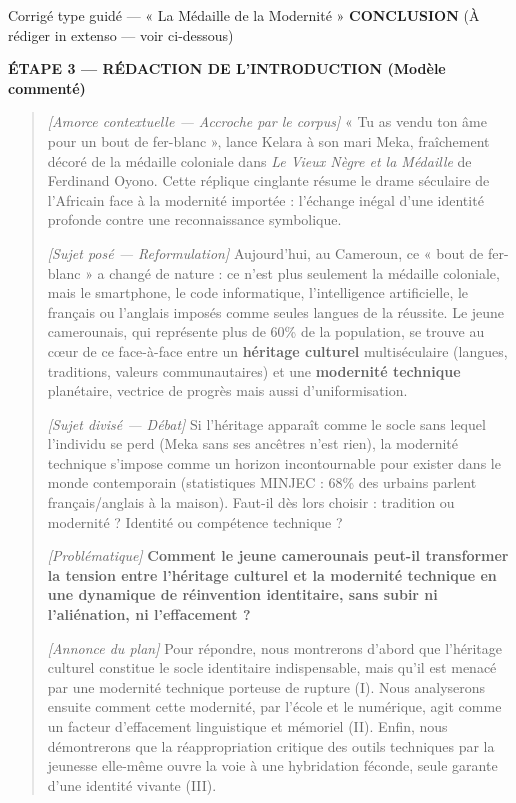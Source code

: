 \documentclass[11pt]{article}
\begin{document}
\begin{exoresolu}{Corrigé type guidé — « La Médaille de la Modernité »}
\textbf{CONCLUSION} (À rédiger in extenso — voir ci-dessous)

\tcblower

\textbf{ÉTAPE 3 — RÉDACTION DE L'INTRODUCTION (Modèle commenté)}

\begin{quote}
    \textit{[Amorce contextuelle — Accroche par le corpus]} « Tu as vendu ton âme pour un bout de fer-blanc », lance Kelara à son mari Meka, fraîchement décoré de la médaille coloniale dans \emph{Le Vieux Nègre et la Médaille} de Ferdinand Oyono. Cette réplique cinglante résume le drame séculaire de l'Africain face à la modernité importée : l'échange inégal d'une identité profonde contre une reconnaissance symbolique.
    
    \textit{[Sujet posé — Reformulation]} Aujourd'hui, au Cameroun, ce « bout de fer-blanc » a changé de nature : ce n'est plus seulement la médaille coloniale, mais le smartphone, le code informatique, l'intelligence artificielle, le français ou l'anglais imposés comme seules langues de la réussite. Le jeune camerounais, qui représente plus de 60\% de la population, se trouve au cœur de ce face-à-face entre un \textbf{héritage culturel} multiséculaire (langues, traditions, valeurs communautaires) et une \textbf{modernité technique} planétaire, vectrice de progrès mais aussi d'uniformisation.
    
    \textit{[Sujet divisé — Débat]} Si l'héritage apparaît comme le socle sans lequel l'individu se perd (Meka sans ses ancêtres n'est rien), la modernité technique s'impose comme un horizon incontournable pour exister dans le monde contemporain (statistiques MINJEC : 68\% des urbains parlent français/anglais à la maison). Faut-il dès lors choisir : tradition ou modernité ? Identité ou compétence technique ?
    
    \textit{[Problématique]} \textbf{Comment le jeune camerounais peut-il transformer la tension entre l'héritage culturel et la modernité technique en une dynamique de réinvention identitaire, sans subir ni l'aliénation, ni l'effacement ?}
    
    \textit{[Annonce du plan]} Pour répondre, nous montrerons d'abord que l'héritage culturel constitue le socle identitaire indispensable, mais qu'il est menacé par une modernité technique porteuse de rupture (I). Nous analyserons ensuite comment cette modernité, par l'école et le numérique, agit comme un facteur d'effacement linguistique et mémoriel (II). Enfin, nous démontrerons que la réappropriation critique des outils techniques par la jeunesse elle-même ouvre la voie à une hybridation féconde, seule garante d'une identité vivante (III).
\end{quote}


\end{exoresolu}
\end{document}
